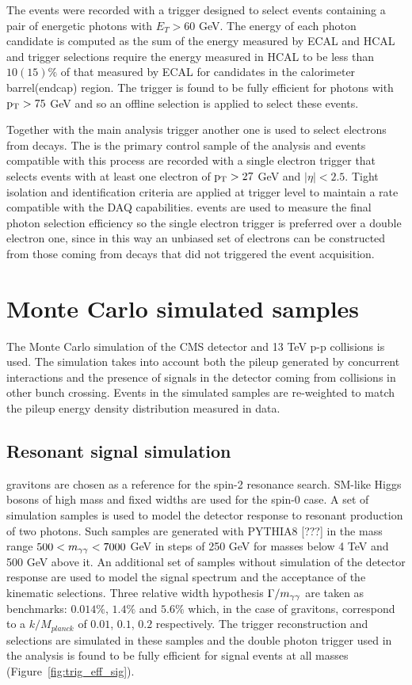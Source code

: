 The events were recorded with a trigger designed to select events containing a pair of
energetic photons with $E_T > 60$ GeV. The energy of each photon candidate is computed as
the sum of the energy measured by ECAL and HCAL and trigger selections require
the energy measured in HCAL to be less than $10(15)\%$ of that measured by ECAL for candidates
in the calorimeter barrel(endcap) region.
The trigger is found to be fully efficient for photons with $\mathrm{p_{T}} > 75$ GeV and so an offline
selection is applied to select these events.

Together with the main analysis trigger another one is used to select electrons from \Zee decays.
The \Zee is the primary control sample of the analysis and events compatible with this process
are recorded with a single electron trigger that selects events with at least one electron of
$\mathrm{p_{T}} > 27$ GeV and $|\eta| < 2.5$. Tight isolation and identification criteria are applied at trigger
level to maintain a rate compatible with the DAQ capabilities.
\Zee events are used to measure the final photon selection efficiency so the single electron trigger
is preferred over a double electron one, since in this way an unbiased set of electrons can be
constructed from those coming from \Zee decays that did not triggered the event acquisition.

\clearpage
\section{Monte Carlo simulated samples}
The Monte Carlo simulation of the CMS detector and 13 TeV p-p collisions is used. The simulation
takes into account both the pileup generated by concurrent interactions and the presence of
signals in the detector coming from collisions in other bunch crossing. Events in the simulated samples
are re-weighted to match the pileup energy density distribution measured in data.

\subsection{Resonant signal simulation}
\RS gravitons are chosen as a reference for the spin-2 resonance search. SM-like Higgs bosons of high mass and
fixed widths are used for the spin-0 case.
A set of simulation samples is used to model the detector response to resonant production of two photons.
Such samples are generated with PYTHIA8 [???] in the mass range $500 < m_{\gamma\gamma} < 7000$ GeV in steps of 250 GeV for
masses below 4 TeV and 500 GeV above it. An additional set of samples without simulation of the detector
response are used to model the signal spectrum and the acceptance of the kinematic selections.
Three relative width hypothesis $\Gamma/m_{\gamma\gamma}$ are taken as benchmarks: $0.014\%$, $1.4\%$ and $5.6\%$ which,
in the case of \RS gravitons, correspond to a $k/M_{planck}$ of $0.01$, $0.1$, $0.2$ respectively.
The trigger reconstruction and selections are simulated in these samples and the double photon trigger
used in the analysis is found to be fully efficient for signal events at all masses (Figure~\ref{fig:trig_eff_sig}).

